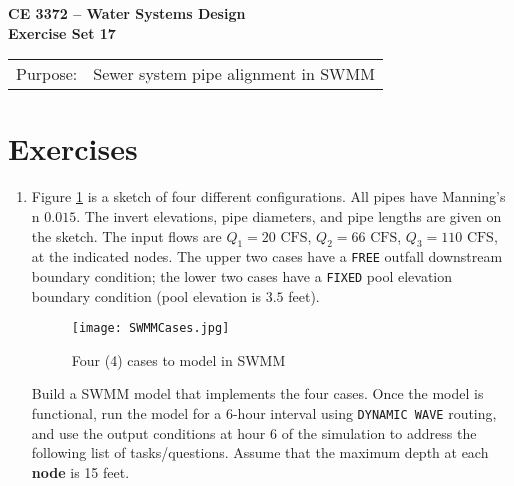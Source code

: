 \documentclass[12pt]{article}
\begin{document}
\begin{center}
{\textbf{{ CE 3372 -- Water Systems Design} \\ {Exercise Set 17}}}
\end{center}
\begingroup
\begin{tabular}{p{1in} p{5in}}
Purpose: & Sewer system pipe alignment in SWMM \\

\end{tabular}
\endgroup
\section*{\small{Exercises}}
\begin{enumerate}

\item Figure \ref{fig:SWMMCases} is a sketch of four different configurations.  All pipes have Manning's n $0.015$.  The invert elevations, pipe diameters, and pipe lengths are given on the sketch.   The input flows are $Q_1 = 20 \text{ CFS}$, $Q_2 = 66 \text{ CFS}$, $Q_3 = 110 \text{ CFS}$, at the indicated nodes.   The upper two cases have a \texttt{FREE} outfall downstream boundary condition; the lower two cases have a \texttt{FIXED} pool elevation boundary condition (pool elevation is $3.5$ feet).

\begin{figure}[h!] %
\centering
   \texttt{[image: SWMMCases.jpg]}
   \caption{Four (4) cases to model in SWMM}
   \label{fig:SWMMCases} 
\end{figure}


Build a SWMM model that implements the four cases.  Once the model is functional, run the model for a 6-hour interval using \texttt{DYNAMIC WAVE} routing, and use the output conditions at hour 6 of the simulation to address the following list of tasks/questions.  Assume that the maximum depth at each \textbf{node} is 15 feet.


\end{enumerate}
\end{document}
